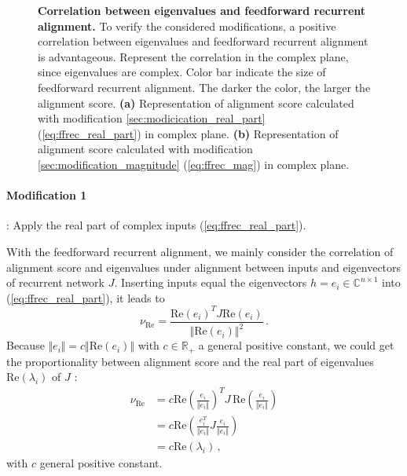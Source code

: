 \documentclass[11pt]{article}
\begin{document}
\begin{figure}
			\caption{\textbf{Correlation between eigenvalues and feedforward recurrent alignment.} To verify the considered modifications, a positive correlation between eigenvalues and feedforward recurrent alignment is advantageous. Represent the correlation in the complex plane, since eigenvalues are complex. Color bar indicate the size of feedforward recurrent alignment. The darker the color, the larger the alignment score.  \textbf{(a)} Representation of alignment score calculated with modification \ref{sec:modicication_real_part} (\ref{eq:ffrec_real_part}) in complex plane. \textbf{(b)} Representation of alignment score calculated with modification \ref{sec:modification_magnitude} (\ref{eq:ffrec_mag}) in complex plane.}
		\end{figure}
	
	\paragraph{Modification 1}: Apply the real part of complex inputs (\ref{eq:ffrec_real_part}).
	
	With the feedforward recurrent alignment, we mainly consider the correlation of alignment score and eigenvalues under alignment between inputs and eigenvectors of recurrent network $J$. Inserting inputs equal the eigenvectors $h = e_i \in \mathbb{C}^{n \times 1}$ into (\ref{eq:ffrec_real_part}), it leads to
		\begin{equation}
			\nu_{\text{Re}} = \frac{\text{Re}(e_i)^T J \text{Re}(e_i)}{\Vert \text{Re}(e_i)\Vert^2} \, .
		\end{equation}
	Because $\Vert e_i \Vert = c \Vert \text{Re}(e_i) \Vert$ with $c \in \mathbb{R_{+}}$ a general positive constant, we could get the proportionality between alignment score and the real part of eigenvalues $\text{Re}(\lambda_i)$ of $J$ :
		\begin{equation}
			\begin{split}
				\nu_{\text{Re}} & = c \text{Re}\left( \frac{e_i}{\Vert e_i \Vert} \right)^T J \, \text{Re}\left( \frac{e_i}{\Vert e_i \Vert} \right) \\
				& = c \text{Re} \left( \frac{e_i^T}{\Vert e_i \Vert} J \frac{e_i}{\Vert e_i \Vert} \right) \\
				& = c \text{Re}(\lambda_i) \, ,
			\end{split}
		\end{equation}
	with $c$ general positive constant.
	
\end{document}
